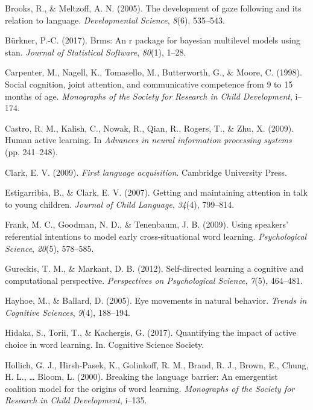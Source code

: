 \documentclass[man,floatsintext]{apa6}
\begin{document}
\hypertarget{ref-brooks2005development}{}
Brooks, R., \& Meltzoff, A. N. (2005). The development of gaze following
and its relation to language. \emph{Developmental Science}, \emph{8}(6),
535--543.

\hypertarget{ref-burkner2017brms}{}
Bürkner, P.-C. (2017). Brms: An r package for bayesian multilevel models
using stan. \emph{Journal of Statistical Software}, \emph{80}(1), 1--28.

\hypertarget{ref-carpenter1998social}{}
Carpenter, M., Nagell, K., Tomasello, M., Butterworth, G., \& Moore, C.
(1998). Social cognition, joint attention, and communicative competence
from 9 to 15 months of age. \emph{Monographs of the Society for Research
in Child Development}, i--174.

\hypertarget{ref-castro2009human}{}
Castro, R. M., Kalish, C., Nowak, R., Qian, R., Rogers, T., \& Zhu, X.
(2009). Human active learning. In \emph{Advances in neural information
processing systems} (pp. 241--248).

\hypertarget{ref-clark2009first}{}
Clark, E. V. (2009). \emph{First language acquisition}. Cambridge
University Press.

\hypertarget{ref-estigarribia2007getting}{}
Estigarribia, B., \& Clark, E. V. (2007). Getting and maintaining
attention in talk to young children. \emph{Journal of Child Language},
\emph{34}(4), 799--814.

\hypertarget{ref-frank2009using}{}
Frank, M. C., Goodman, N. D., \& Tenenbaum, J. B. (2009). Using
speakers' referential intentions to model early cross-situational word
learning. \emph{Psychological Science}, \emph{20}(5), 578--585.

\hypertarget{ref-gureckis2012self}{}
Gureckis, T. M., \& Markant, D. B. (2012). Self-directed learning a
cognitive and computational perspective. \emph{Perspectives on
Psychological Science}, \emph{7}(5), 464--481.

\hypertarget{ref-hayhoe2005eye}{}
Hayhoe, M., \& Ballard, D. (2005). Eye movements in natural behavior.
\emph{Trends in Cognitive Sciences}, \emph{9}(4), 188--194.

\hypertarget{ref-hidaka2017quantifying}{}
Hidaka, S., Torii, T., \& Kachergis, G. (2017). Quantifying the impact
of active choice in word learning. In. Cognitive Science Society.

\hypertarget{ref-hollich2000breaking}{}
Hollich, G. J., Hirsh-Pasek, K., Golinkoff, R. M., Brand, R. J., Brown,
E., Chung, H. L., \ldots{} Bloom, L. (2000). Breaking the language
barrier: An emergentist coalition model for the origins of word
learning. \emph{Monographs of the Society for Research in Child
Development}, i--135.
\end{document}
